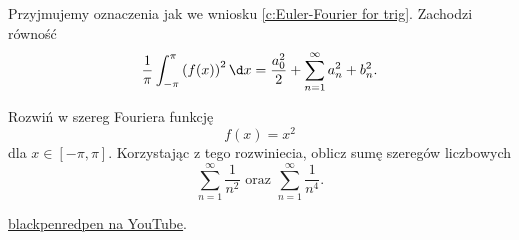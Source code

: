 \begin{corollary}
    Przyjmujemy oznaczenia jak we wniosku \ref{c:Euler-Fourier for trig}. Zachodzi równość
    \[ \frac{1}{\pi}\int_{-\pi}^\pi \left(f(x)\right)^2 \d x = \frac{a_0^2}{2} + \sum_{n=1}^\infty a_n^2 + b_n^2. \]
\end{corollary}

\begin{example}
    Rozwiń w szereg Fouriera funkcję
    \[ f(x) = x^2 \]
    dla $x \in [-\pi, \pi]$. Korzystając z tego rozwiniecia, oblicz sumę szeregów liczbowych
    \[ \sum_{n=1}^\infty \frac{1}{n^2} \text{ oraz } \sum_{n=1}^\infty \frac{1}{n^4}. \]
\end{example}
\begin{solution}
    \href{https://www.youtube.com/watch?v=2VYBGF_MPIU}{blackpenredpen na YouTube}.
\end{solution}
